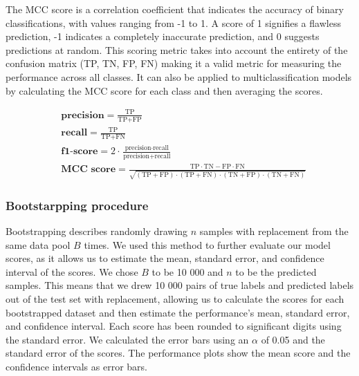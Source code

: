 \documentclass{bioinfo}
\begin{document}
\begin{methods}
The MCC score is a correlation coefficient that indicates the accuracy of binary classifications, with values ranging from -1 to 1. 
A score of 1 signifies a flawless prediction, -1 indicates a completely inaccurate prediction, and 0 suggests predictions at random.
This scoring metric takes into account the entirety of the confusion matrix (TP, TN, FP, FN) making it a valid
metric for measuring the performance across all classes.
It can also be applied to multiclassification models by calculating the MCC score for each class and then averaging the scores.

\begin{align}
	&\textbf{precision} = \frac{\text{TP}}{\text{TP} + \text{FP}} \\
    &\textbf{recall} = \frac{\text{TP}}{\text{TP} + \text{FN}} \\
    &\textbf{f1-score} = 2 \cdot \frac{\text{precision} \cdot \text{recall}}{\text{precision} + \text{recall}} \\
    &\textbf{MCC score} = \frac{\text{TP} \cdot \text{TN} - \text{FP} \cdot \text{FN}}{\sqrt{(\text{TP} + \text{FP}) \cdot (\text{TP} + \text{FN}) \cdot (\text{TN} + \text{FP}) \cdot (\text{TN} + \text{FN})}}
\end{align}




\subsubsection{Bootstarpping procedure}
Bootstrapping describes randomly drawing $n$ samples with replacement from the same data pool $B$ times.
We used this method to further evaluate our model scores, as it allows us to estimate the mean, standard error, and confidence interval of the scores.
We chose $B$ to be 10 000 and $n$ to be the predicted samples.
This means that we drew 10 000 pairs of true labels and predicted labels out of the test set with replacement,
allowing us to calculate the scores for each bootstrapped dataset and then estimate the performance's mean, 
standard error, and confidence interval.
Each score has been rounded to significant digits using the standard error.
We calculated the error bars using an $\alpha$ of 0.05 and the standard error of the scores.
The performance plots show the mean score and the confidence intervals as error bars.

\end{methods}
\end{document}
